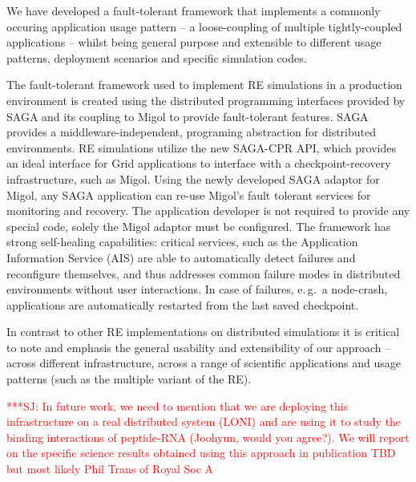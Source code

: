 \documentclass[times, 10pt, twocolumn]{article}
\newcommand{\jhanote}[1]{ {\textcolor{red} { ***SJ: #1 }}}
\newcommand{\jhanote}[1]{}
\begin{document}

We have developed a fault-tolerant framework that implements a
commonly occuring application usage pattern -- a loose-coupling of
multiple tightly-coupled applications -- whilst being general purpose
and extensible to different usage patterns, deployment scenarios and
specific simulation codes.

The fault-tolerant framework used to implement RE simulations in a
production environment is created using the distributed programming
interfaces provided by SAGA and its coupling to Migol to provide
fault-tolerant features.  SAGA provides a middleware-independent,
programing abstraction for distributed environments. RE simulations
utilize the new SAGA-CPR API, which provides an ideal interface for
Grid applications to interface with a checkpoint-recovery
infrastructure, such as Migol. Using the newly developed SAGA adaptor
for Migol, any SAGA application can re-use Migol's fault tolerant
services for monitoring and recovery.  The application developer is
not required to provide any special code, solely the Migol adaptor
must be configured.  The framework has strong self-healing
capabilities: critical services, such as the Application Information
Service (AIS) are able to automatically detect failures and
reconfigure themselves, and thus addresses common failure modes in
distributed environments without user interactions.
In case of failures, e.\,g.\ a node-crash, applications are
automatically restarted from the last saved
checkpoint. %

In contrast to other RE implementations on distributed
simulations it is critical to note and emphasis the general usability
and extensibility of our approach -- across different infrastructure,
across a range of scientific applications and usage patterns (such as
the multiple variant of the RE).

\jhanote{In future work, we need to mention that we are deploying this
  infrastructure on a real distributed system (LONI) and are using it
  to study the binding interactions of peptide-RNA (Joohyun, would you
  agree?). We will report on the specific science results obtained
  using this approach in publication TBD but most likely Phil Trans of
  Royal Soc A}
\end{document}
